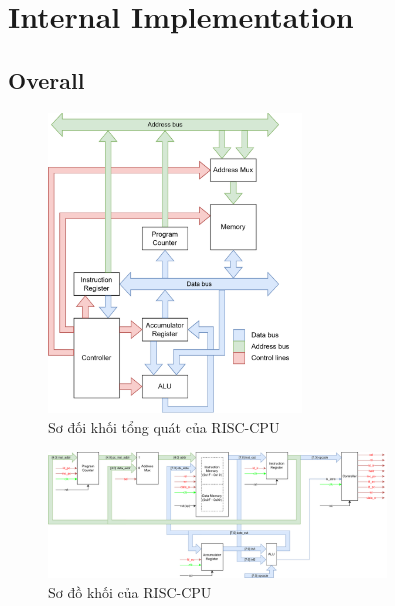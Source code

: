 \chapter{Internal Implementation}
    \section{Overall}
        \begin{figure}[h]
            \centering
            \includegraphics[width=0.6\textwidth]{graphics/RISC-CPU_simple.drawio.png}
            \caption{Sơ đối khối tổng quát của RISC-CPU}
        \end{figure}
        \newpage
        \begin{figure}[h]
            \centering
            \includegraphics[width=0.8\textwidth]{graphics/RISC-CPU.drawio.png}
            \caption{Sơ đồ khối của RISC-CPU}
        \end{figure}


